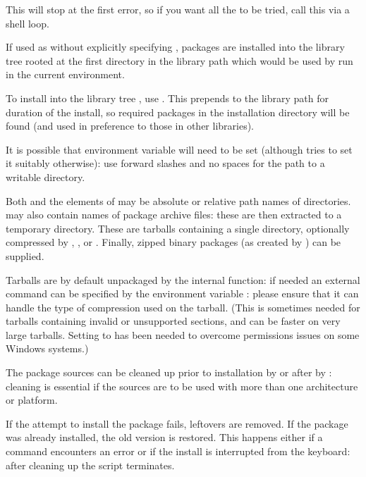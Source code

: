 %
\begin{Details}\relax
This will stop at the first error, so if you want all the 
to be tried, call this via a shell loop.

If used as  without explicitly specifying
, packages are installed into the library tree rooted at the
first directory in the library path which would be used by \R{} run in
the current environment.

To install into the library tree , use
.
This prepends  to the library path for
duration of the install, so required packages in the installation
directory will be found (and used in preference to those in other
libraries).

It is possible that environment variable 
will need to be set (although  tries to set it suitably
otherwise): use forward slashes and no spaces for the path to a
writable directory.

Both  and the elements of  may be absolute or
relative path names of directories.   may also contain
names of package archive files: these are then extracted to a
temporary directory.  These are tarballs containing a single
directory, optionally compressed by , ,
 or .
Finally, zipped binary packages (as created by
) can be supplied.

Tarballs are by default unpackaged by the internal 
function: if needed an external  command can be specified
by the environment variable : please ensure that it
can handle the type of compression used on the tarball.  (This is
sometimes needed for tarballs containing invalid or unsupported
sections, and can be faster on very large tarballs.   Setting
 to  has been needed to overcome
permissions issues on some Windows systems.)

The package sources can be cleaned up prior to installation by
 or after by : cleaning is
essential if the sources are to be used with more than one
architecture or platform.

If the attempt to install the package fails, leftovers are removed.
If the package was already installed, the old version is restored.
This happens either if a command encounters an error or if the
install is interrupted from the keyboard: after cleaning up the script
terminates.


\end{Details}
